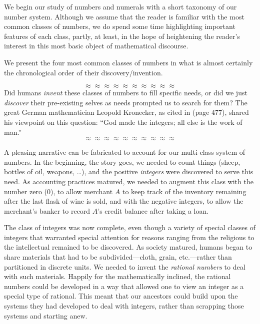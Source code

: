 We begin our study of numbers and numerals with a short taxonomy of
our number system.  Although we assume that the reader is familiar
with the most common classes of numbers, we do spend some time
highlighting important features of each class, partly, at least, in
the hope of heightening the reader's interest in this most basic
object of mathematical discourse.

We present the four most common classes of numbers in what is almost
certainly the chronological order of their discovery/invention.

\[ \approx \approx \approx \approx \approx \approx \approx \approx \approx \approx \]
Did humans {\em invent} these classes of numbers to fill specific
needs, or did we just {\em discover} their pre-existing selves as
needs prompted us to search for them?  The great German mathematician
Leopold Kronecker, 
as cited in \cite{Bell86} (page 477), shared his viewpoint on this
question: ``God made the integers; all else is the work of man.''
\[ \approx \approx \approx \approx \approx \approx \approx \approx \approx \approx \]

\noindent
A pleasing narrative can be fabricated to account for our multi-class
system of numbers.  In the beginning, the story goes, we needed to
count things (sheep, bottles of oil, weapons, \ldots), and the
positive {\it integers} were discovered to serve
this need.  As accounting practices matured, we needed to augment this
class with the number zero  ($0$), to allow
merchant $A$ to keep track of the inventory remaining after the last
flask of wine is sold, and with the negative integers,
 to allow the merchant's banker to record $A$'s
credit balance after taking a loan.
%
{ }
{}  
%
The class of integers was now complete, even though a variety of
special classes of integers that warranted special attention for
reasons ranging from the religious to the intellectual remained to be
discovered.  As society matured, humans began to share materials that
had to be subdivided---cloth, grain, etc.---rather than partitioned in
discrete units.  We needed to invent the {\it rational numbers}
 to deal with such materials.  Happily for the
mathematically inclined, the rational numbers could be developed in a
way that allowed one to view an integer as a special type of rational.
This meant that our ancestors could build upon the systems they had
developed to deal with integers, rather than scrapping those systems
and starting anew.

